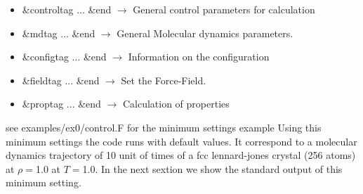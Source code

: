 \documentclass[a4paper]{article}
\begin{document}
\begin{itemize}
\item \&controltag ... \&end $\rightarrow$ General control parameters for calculation 
\item \&mdtag ... \&end      $\rightarrow$ General Molecular dynamics parameters.
\item \&configtag ... \&end  $\rightarrow$ Information on the configuration
\item \&fieldtag ... \&end   $\rightarrow$ Set the Force-Field.
\item \&proptag ... \&end    $\rightarrow$ Calculation of properties
\end{itemize}

see examples/ex0/control.F for the minimum settings example
Using this minimum settings the code runs with default values.
It correspond to a molecular dynamics trajectory of 10 unit of times of a fcc lennard-jones 
crystal (256 atoms) at $\rho=$1.0 at $T=$1.0. In the next sextion we show the standard output of this minimum setting. 

\clearpage
\end{document}
